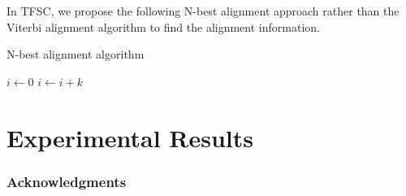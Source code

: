 \documentclass{article}
\begin{document}
In TFSC, we propose the following N-best alignment approach rather than
the Viterbi alignment algorithm to find the alignment information.

\begin{algorithm}
  \caption{N-best alignment algorithm}
  \begin{algorithmic}


    \EndFor
  \EndFor

      \State $i\gets 0$
  \Else
          \State $i\gets i+k$
      \EndIf
  \EndIf
  \label{algorithm:n_best_alignment}
  \end{algorithmic}
\end{algorithm}





\section{Experimental Results}
\label{sec:experimental_results}


\subsubsection*{Acknowledgments}



\small

\clearpage
\newpage


\end{document}
